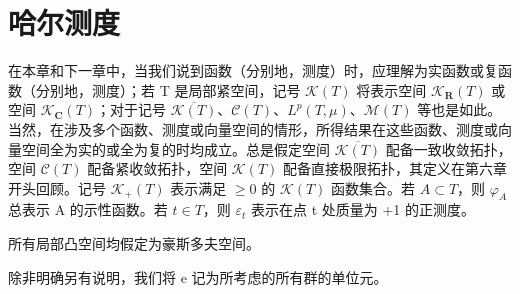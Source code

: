 \chapter{哈尔测度}

在本章和下一章中，当我们说到函数（分别地，测度）时，应理解为实函数或复函数（分别地，测度）；若 T 是局部紧空间，记号 \(\mathcal{K}(T)\) 将表示空间 \(\mathcal{K}_{\mathbf{R}}(T)\) 或空间 \(\mathcal{K}_{\mathbf{C}}(T)\)；对于记号 \(\overline{\mathcal{K}(T)}\)、\(\mathcal{C}(T)\)、\(L^{p}(T,\mu)\)、\(\mathcal{M}(T)\) 等也是如此。当然，在涉及多个函数、测度或向量空间的情形，所得结果在这些函数、测度或向量空间全为实的或全为复的时均成立。总是假定空间 \(\overline{\mathcal{K}(T)}\) 配备一致收敛拓扑，空间 \(\mathcal{C}(T)\) 配备紧收敛拓扑，空间 \(\mathcal{K}(T)\) 配备直接极限拓扑，其定义在第六章开头回顾。记号 \(\mathcal{K}_{+}(T)\) 表示满足 \(\geqslant0\) 的 \(\mathcal{K}(T)\) 函数集合。若 \(A\subset T\)，则 \(\varphi_{A}\) 总表示 A 的示性函数。若 \(t\in T\)，则 \(\varepsilon_{t}\) 表示在点 t 处质量为 +1 的正测度。

所有局部凸空间均假定为豪斯多夫空间。

除非明确另有说明，我们将 e 记为所考虑的所有群的单位元。


